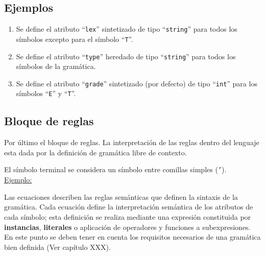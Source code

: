 \subsection*{Ejemplos}
\begin{enumerate}

\item 
\begin{center}
\end{center}
\vspace{0.2cm}
Se define el atributo ``\texttt{lex}'' sintetizado de tipo ``\texttt{string}'' para todos los símbolos excepto para el símbolo ``\texttt{T}''.

\item

\begin{center}
\end{center}
\vspace{0.2cm}
Se define el atributo ``\texttt{type}'' heredado de tipo ``\texttt{string}'' para todos los símbolos de la gramática.

\item 

\begin{center}
\end{center}
\vspace{0.2cm}
Se define el atributo ``\texttt{grade}'' sintetizado (por defecto) de tipo ``\texttt{int}'' para los símbolos ``\texttt{E}'' y ``\texttt{T}''.\\
\end{enumerate}
\subsection{Bloque de reglas}
Por último el bloque de reglas. La interpretación de las reglas dentro del lenguaje esta dada por la definición de gramática libre de contexto.          

El símbolo terminal se considera un símbolo entre comillas simples (\texttt{'}).\\ 

\underline{Ejemplo:}\ \\
\vspace{0.2cm}

Las ecuaciones describen las reglas semánticas que definen la sintaxis de la gramática. Cada ecuación define la interpretación semántica de los atributos de cada símbolo; esta definición se realiza mediante una expresión constituida por \textbf{instancias}, \textbf{literales} o aplicación de operadores y funciones a subexpresiones.
En este punto se deben tener en cuenta los requisitos necesarios de una gramática bien definida (Ver capítulo XXX).

